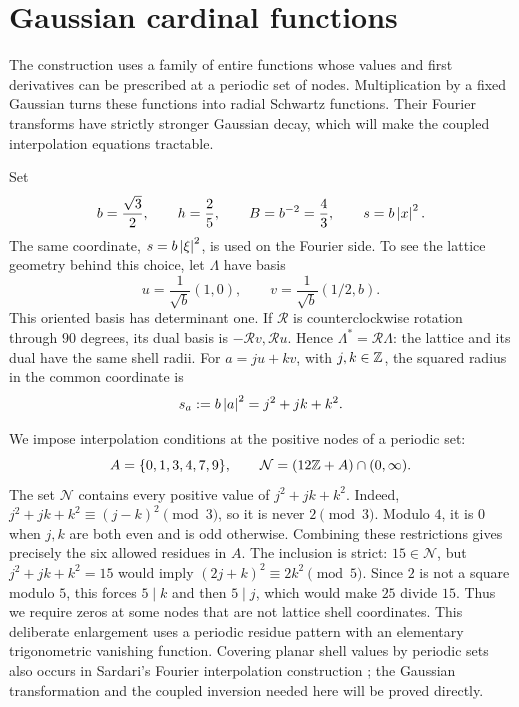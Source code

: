\section{Gaussian cardinal functions}\label{sec:fourier}

The construction uses a family of entire functions whose values and first
derivatives can be prescribed at a periodic set of nodes.  Multiplication by
a fixed Gaussian turns these functions into radial Schwartz functions.  Their
Fourier transforms have strictly stronger Gaussian decay, which will make the
coupled interpolation equations tractable.

Set
\begin{equation}\label{fourier:parameters}
 b=\frac{\sqrt3}{2},\qquad h=\frac25,\qquad B=b^{-2}=\frac43,
 \qquad s=b\left\lvert x\right\rvert^2.
\end{equation}
The same coordinate, \(s=b\left\lvert\xi\right\rvert^2\), is used on the Fourier side.
To see the lattice geometry behind this choice, let \(\Lambda\) have basis
\begin{equation}\label{fourier:lattice}
 u=\frac{1}{\sqrt b}(1,0),\qquad
 v=\frac{1}{\sqrt b}(1/2,b).
\end{equation}
This oriented basis has determinant one.  If \(\mathcal R\) is
counterclockwise rotation through \(90\) degrees, its dual basis is
\(-\mathcal R v,\mathcal R u\).  Hence
\(\Lambda^*=\mathcal R\Lambda\): the lattice and its dual have the same
shell radii.  For \(a=ju+kv\), with \(j,k\in\mathbb Z\), the squared radius in
the common coordinate is
\begin{equation}\label{fourier:shell-coordinate}
 s_a:=b\left\lvert a\right\rvert^2=j^2+jk+k^2.
\end{equation}

We impose interpolation conditions at the positive nodes of a periodic set:
\begin{equation}\label{fourier:nodes}
 A=\{0,1,3,4,7,9\},\qquad
 \mathcal N=(12\mathbb Z+A)\cap(0,\infty).
\end{equation}
The set \(\mathcal N\) contains every positive value of \(j^2+jk+k^2\).
Indeed,
\(j^2+jk+k^2\equiv(j-k)^2\pmod3\), so it is never \(2\pmod3\).
Modulo \(4\), it is \(0\) when \(j,k\) are both even and is odd otherwise.
Combining these restrictions gives precisely the six allowed
residues in \(A\).  The inclusion is strict: \(15\in\mathcal N\), but
\(j^2+jk+k^2=15\) would imply
\((2j+k)^2\equiv2k^2\pmod5\).  Since \(2\) is not a square modulo \(5\),
this forces \(5\mid k\) and then \(5\mid j\), which would make \(25\)
divide \(15\).  Thus we require zeros at some nodes that are not lattice
shell coordinates.
This deliberate enlargement uses a periodic residue pattern with an
elementary trigonometric vanishing function. Covering planar shell values by
periodic sets also occurs in Sardari's Fourier interpolation construction
\cite[Section~6.1]{Sardari2021}; the Gaussian transformation and the
coupled inversion needed here will be proved directly.

